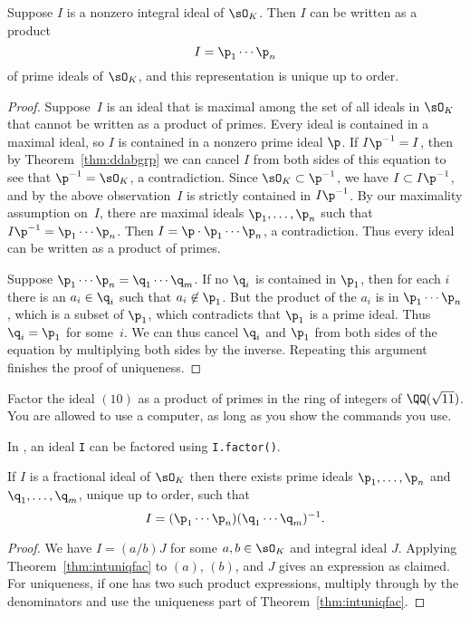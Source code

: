 \begin{theorem}\label{thm:intuniqfac}
  Suppose $I$ is a nonzero integral ideal of $\sO_K$.  Then $I$ can
  be written as a product
  $$
    I = \p_1\cdots \p_n
  $$
  of prime ideals of $\sO_K$, and this representation is unique up to
  order.
\end{theorem}
\begin{proof}
  Suppose~$I$ is an ideal that is maximal among the set of all ideals in
  $\sO_K$ that cannot be written as a product of primes.  Every ideal is
  contained in a maximal ideal, so $I$ is contained in a nonzero prime
  ideal $\p$.  If $I\p^{-1} = I$, then by Theorem~\ref{thm:ddabgrp} we
  can cancel $I$ from both sides of this equation to see that
  $\p^{-1}=\sO_K$, a contradiction.  Since $\sO_K\subset \p^{-1}$,
  we have $I\subset I\p^{-1}$, and by the above observation~$I$
  is strictly contained in $I\p^{-1}$.
  By our maximality assumption on~$I$, there are maximal
  ideals $\p_1,\dots,\p_n$ such that $I\p^{-1} = \p_1\cdots \p_n$.
  Then $I=\p\cdot \p_1\cdots \p_n$, a contradiction.  Thus every ideal
  can be written as a product of primes.

  Suppose $\p_1\cdots \p_n=\q_1\cdots \q_m$. If no $\q_i$ is contained in
  $\p_1$, then for each $i$ there is an $a_i\in \q_i$ such that
  $a_i\not\in\p_1$.  But the product of the $a_i$ is in $\p_1\cdots
  \p_n$, which is a subset of $\p_1$, which contradicts that
  $\p_1$ is a prime ideal.  Thus $\q_i=\p_1$ for some~$i$.  We can thus
  cancel $\q_i$ and $\p_1$ from both sides of the equation by multiplying
  both sides by the inverse.
  Repeating this argument finishes the proof of uniqueness.
\end{proof}

\begin{exercise}
  Factor the ideal $(10)$ as a product of primes
  in the ring of integers of $\QQ(\sqrt{11})$. You are allowed
  to use a computer, as long as you show the commands you use.
  \begin{hint}
    In {\Sage}, an ideal {\tt I} can be factored using {\tt I.factor()}.
  \end{hint}
\end{exercise}

\begin{theorem}\label{thm:uniqfac}
  If $I$ is a fractional ideal of $\sO_K$ then there exists
  prime ideals $\p_1,\dots,\p_n$ and $\q_1,\dots,\q_m$,
  unique up to order, such that
  $$
    I = (\p_1\cdots \p_n)(\q_1\cdots \q_m)^{-1}.
  $$
\end{theorem}
\begin{proof}
  We have $I=(a/b)J$ for some $a,b\in\sO_K$ and integral ideal $J$.
  Applying Theorem~\ref{thm:intuniqfac} to $(a)$, $(b)$, and $J$ gives
  an expression as claimed.  For uniqueness, if one has two such product
  expressions, multiply through by the denominators and use the
  uniqueness part of Theorem~\ref{thm:intuniqfac}.
\end{proof}

